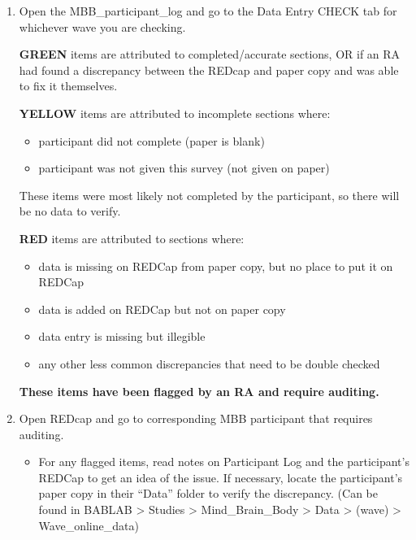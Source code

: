 \documentclass[]{book}
\providecommand{\tightlist}{%
  \setlength{\itemsep}{0pt}\setlength{\parskip}{0pt}}
\begin{document}
\begin{enumerate}
\def\labelenumi{\arabic{enumi}.}
\item
  Open the MBB\_participant\_log and go to the Data Entry CHECK tab for whichever wave you are checking.

  \textbf{GREEN} items are attributed to completed/accurate sections, OR if an RA had found a discrepancy between the REDcap and paper copy and was able to fix it themselves.

  \textbf{YELLOW} items are attributed to incomplete sections where:

  \begin{itemize}
  \tightlist
  \item
    participant did not complete (paper is blank)
  \item
    participant was not given this survey (not given on paper)
  \end{itemize}

  These items were most likely not completed by the participant, so there will be no data to verify.

  \textbf{RED} items are attributed to sections where:

  \begin{itemize}
  \tightlist
  \item
    data is missing on REDCap from paper copy, but no place to put it on REDCap
  \item
    data is added on REDCap but not on paper copy
  \item
    data entry is missing but illegible
  \item
    any other less common discrepancies that need to be double checked
  \end{itemize}

  \textbf{These items have been flagged by an RA and require auditing.}
\item
  Open REDcap and go to corresponding MBB participant that requires auditing.

  \begin{itemize}
  \tightlist
  \item
    For any flagged items, read notes on Participant Log and the participant's REDCap to get an idea of the issue. If necessary, locate the participant's paper copy in their ``Data'' folder to verify the discrepancy. (Can be found in BABLAB \textgreater{} Studies \textgreater{} Mind\_Brain\_Body \textgreater{} Data \textgreater{} (wave) \textgreater{} Wave\_online\_data)
  \end{itemize}
\end{enumerate}
\end{document}
